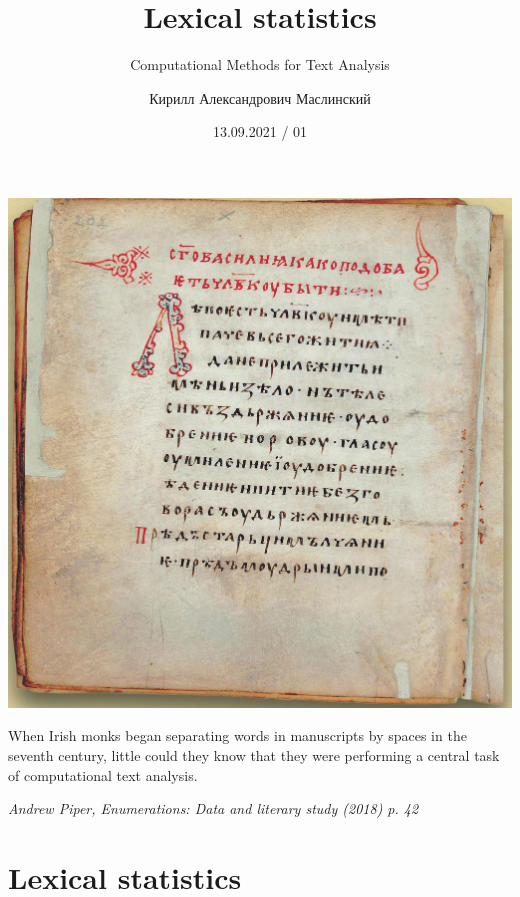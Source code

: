\documentclass[svgnames]{beamer}
\title[CMTA 01] %
{Lexical statistics}
\subtitle
{Computational Methods for Text Analysis} %
\author%
{Кирилл Александрович Маслинский}
\institute%
{НИУ ВШЭ Санкт-Петербург}
\date%
{13.09.2021 / 01}
\begin{document}
\begin{frame}
  \titlepage
\end{frame}

\begin{frame}[plain]
  \centering
  \Huge\bfseries
\end{frame}


\begin{frame}
  \centering
  \includegraphics[height=.95\textheight]{izbornik1076}
\end{frame}

\begin{frame}[standout]
  When Irish monks began separating words in manuscripts
by spaces in the seventh century, little could they know
that they were performing a central task of computational
text analysis.

\textit{Andrew Piper, Enumerations: Data and literary study (2018) p. 42}
\end{frame}

\section{Lexical statistics}
\end{document}
